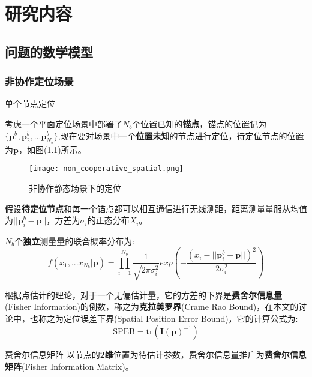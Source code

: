 \chapter{研究内容}
\label{cha:content}

\section{问题的数学模型}\label{section:model}

\subsection[非协作定位场景]{非协作定位场景}\label{subsection:noncooperative_localization}

{单个节点定位}

        考虑一个平面定位场景中部署了$N_b$个位置已知的\textbf{锚点}，锚点的位置记为$\{\bm{p}^b_1,\bm{p}^b_2,...\bm{p}^b_{N_b}\}$,现在要对场景中一个\textbf{位置未知}的节点进行定位，待定位节点的位置为$\bm{p}$，如图(\ref{fig:non_cooperative_spatial})所示。
        \begin{figure}
          \centering
          \texttt{[image: non\_cooperative\_spatial.png]}
          \caption{非协作静态场景下的定位}\label{fig:non_cooperative_spatial}
        \end{figure}
假设\textbf{待定位节点}和每一个锚点都可以相互通信进行无线测距，距离测量量服从均值为$||\bm{p}^b_i-\bm{p}||$，方差为$\sigma_i$的正态分布$X_i$。

$N_b$个\textbf{独立}测量量的联合概率分布为:
\begin{equation}\label{eq:single}
f(x_1,...x_{N_b}|\textbf{p})=\prod_{i=1}^{N_b}\frac{1}{\sqrt{2\pi\sigma_i^2}}exp(-\frac{(x_i-||\bm{p}^b_i-\bm{p}||)^2}{2\sigma_i^2})
\end{equation}

根据点估计的理论，对于一个无偏估计量，它的方差的下界是\textbf{费舍尔信息量}(Fisher Information)的倒数，称之为\textbf{克拉美罗界}(Crame Rao Bound)，在本文的讨论中，也称之为定位误差下界(Spatial Position Error Bound)，它的计算公式为:
\begin{equation}\label{eq:SPEB_formula}
  \text{SPEB}=\text{tr}(\bm{I(\bm{p})}^{-1})
\end{equation}


{费舍尔信息矩阵}
以节点的\textbf{2维}位置为待估计参数，费舍尔信息量推广为\textbf{费舍尔信息矩阵}(Fisher Information Matrix)。

